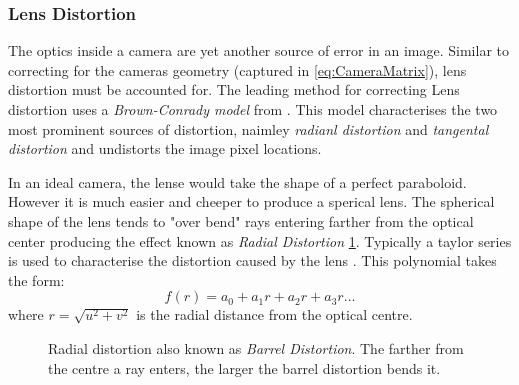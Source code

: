 \documentclass{UoNMCHA}
\numberwithin{equation}{section}
\begin{document}
\subsubsection{Lens Distortion}
The optics inside a camera are yet another source of error in an image. Similar to correcting for the cameras geometry (captured in \ref{eq:CameraMatrix}), lens distortion must be accounted for. The leading method for correcting Lens distortion uses a \textit{Brown-Conrady model} from \cite{fryer1986lens}. This model characterises the two most prominent sources of distortion, naimley \textit{radianl distortion} and \textit{tangental distortion} and undistorts the image pixel locations.

In an ideal camera, the lense would take the shape of a perfect paraboloid. However it is much easier and cheeper to produce a sperical lens. The spherical shape of the lens tends to "over bend" rays entering farther from the optical center producing the effect known as \textit{Radial Distortion} \cref{fig:RadialDistortion}. Typically a taylor series is used to characterise the distortion caused by the lens \cite{learningOpenCV}. This polynomial takes the form:
\begin{equation}
	f(r) = a_{0} + a_{1}r + a_{2}r + a_{3}r\dots
\end{equation}
where $r = \sqrt{u^{2} + v^{2}}$ is the radial distance from the optical centre.

\begin{figure}[ht]
	\caption{Radial distortion also known as \textit{Barrel Distortion}. The farther from the centre a ray enters, the larger the barrel distortion bends it.}	
	\label{fig:RadialDistortion}
\end{figure}
\end{document}

